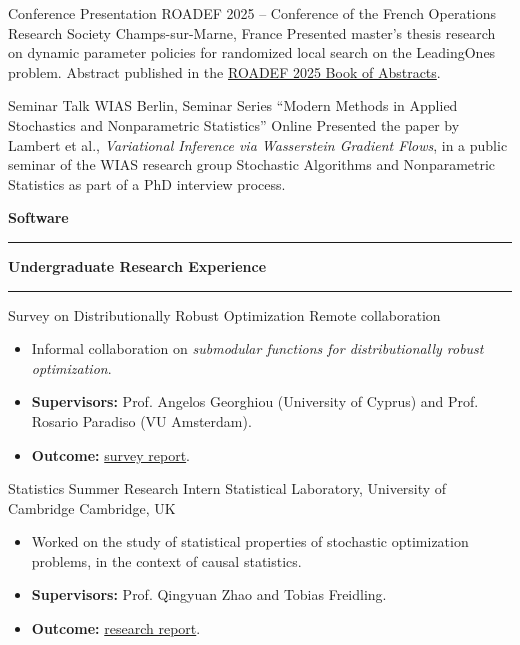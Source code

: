 \documentclass[11pt,a4paper,sans]{moderncv}
\newcommand{\cvsubsection}[1]{%
  \par
  \vspace{0.9em}%
  \noindent
  {\large\bfseries\color{cvaccent}#1}%
  \par
  \vspace{0.15em}%
  \noindent
  {\color{cvline}\rule{\textwidth}{0.4pt}}%
  \par
  \vspace{0.7em}%
}
\begin{document}
%
        {Conference Presentation}%
        {ROADEF 2025 -- Conference of the French Operations Research Society}%
        {Champs-sur-Marne, France}%
        {}%
        {Presented master's thesis research on dynamic parameter policies for randomized local search on the LeadingOnes problem. Abstract published in the \href{https://roadef2025.org/wp-content/uploads/2025/02/ROADEF2025_resumes.pdf}{ROADEF 2025 Book of Abstracts}.}

%
        {Seminar Talk}%
        {WIAS Berlin, Seminar Series ``Modern Methods in Applied Stochastics and Nonparametric Statistics''}%
        {Online}%
        {}%
        {Presented the paper by Lambert et al., \emph{Variational Inference via Wasserstein Gradient Flows}, in a public seminar of the WIAS research group Stochastic Algorithms and Nonparametric Statistics as part of a PhD interview process.}

\cvsubsection{Software}


\newpage
\cvsubsection{Undergraduate Research Experience}

%
        {Survey on Distributionally Robust Optimization}%
        {Remote collaboration}%
        {}%
        {}%
        {\begin{itemize}
          \item Informal collaboration on \emph{submodular functions for distributionally robust optimization}.
          \item \textbf{Supervisors:} Prof. Angelos Georghiou (University of Cyprus) and Prof. Rosario Paradiso (VU Amsterdam).
          \item \textbf{Outcome:} \href{https://gianlucacovini.github.io/assets/files/Reports/DRO_report.pdf}{survey report}.
        \end{itemize}}

%
        {Statistics Summer Research Intern}%
        {Statistical Laboratory, University of Cambridge}%
        {Cambridge, UK}%
        {}%
        {\begin{itemize}
          \item Worked on the study of statistical properties of stochastic optimization problems, in the context of causal statistics.
          \item \textbf{Supervisors:} Prof. Qingyuan Zhao and Tobias Freidling.
          \item \textbf{Outcome:} \href{https://gianlucacovini.github.io/assets/files/Reports/stat_opt_report.pdf}{research report}.
        \end{itemize}}
\end{document}
